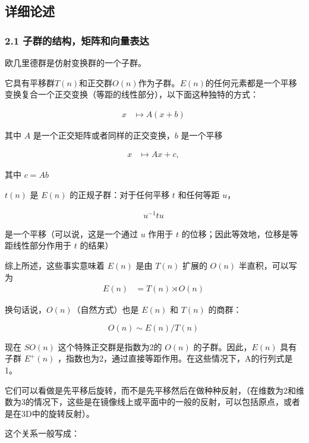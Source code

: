 \subsection{详细论述}

\subsubsection{2.1 子群的结构，矩阵和向量表达}

欧几里德群是仿射变换群的一个子群。

它具有平移群$T(n)$和正交群$O(n)$作为子群。$E(n)$的任何元素都是一个平移变换复合一个正交变换（等距的线性部分），以下面这种独特的方式：

\begin{align}
x & \mapsto A(x + b)~
\end{align}

其中 $A$ 是一个正交矩阵或者同样的正交变换，$b$ 是一个平移

\begin{align}
x & \mapsto Ax + c,~
\end{align}

其中 $c = Ab$

$t(n)$ 是 $E(n)$ 的正规子群：对于任何平移 $t$ 和任何等距 $u$，

\begin{align}
u^{-1} tu~
\end{align}

是一个平移（可以说，这是一个通过 $u$ 作用于 $t$ 的位移；因此等效地，位移是等距线性部分作用于 $t$ 的结果）

综上所述，这些事实意味着 $E(n)$ 是由 $T(n)$ 扩展的 $O(n)$ 半直积，可以写为
\begin{align}
E(n) &= T(n) \rtimes O(n)~
\end{align}

换句话说，$O(n)$（自然方式）也是 $E(n)$ 和 $T(n)$ 的商群：

\begin{equation}
O(n) \sim E(n)/T(n)~
\end{equation}

现在 $SO(n)$ 这个特殊正交群是指数为2的 $O(n)$ 的子群。因此，$E(n)$ 具有子群 $E^{+}(n)$ ，指数也为2，通过直接等距作用。在这些情况下，A的行列式是1。

它们可以看做是先平移后旋转，而不是先平移然后在做种种反射，（在维数为2和维数为3的情况下，这些是在镜像线上或平面中的一般的反射，可以包括原点，或者是在3D中的旋转反射）。

这个关系一般写成：


